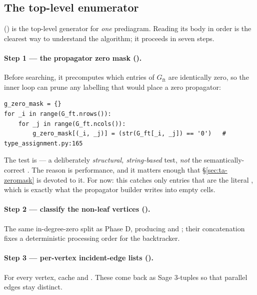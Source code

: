 \subsection{The top-level enumerator}

 () is the
top-level generator for \emph{one} prediagram. Reading its body in order is the
clearest way to understand the algorithm; it proceeds in seven steps.

\paragraph{Step 1 --- the propagator zero mask
().} Before searching, it precomputes which entries of
$G_{\mathrm{ft}}$ are identically zero, so the inner loop can prune any labelling
that would place a zero propagator:

\begin{lstlisting}
g_zero_mask = {}
for _i in range(G_ft.nrows()):
    for _j in range(G_ft.ncols()):
        g_zero_mask[(_i, _j)] = (str(G_ft[_i, _j]) == '0')   # type_assignment.py:165
\end{lstlisting}

The test is  --- a deliberately \emph{structural,
string-based} test, \emph{not} the semantically-correct . The
reason is performance, and it matters enough that \S\ref{sec:ta-zeromask} is
devoted to it. For now: this catches only entries that are the literal
, which is exactly what the propagator builder writes into empty
cells.

\paragraph{Step 2 --- classify the non-leaf vertices
().} The same in-degree-zero split as Phase D, producing
 and ; their concatenation
 fixes a
deterministic processing order for the backtracker.

\paragraph{Step 3 --- per-vertex incident-edge lists ().} For
every vertex, cache  and .
These come back as Sage 3-tuples  so that parallel edges stay
distinct.

